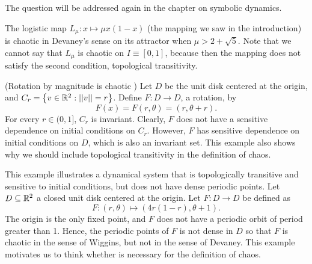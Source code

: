 \documentclass[12pt,draft,twoside]{book}
\begin{document}
  The question will be addressed again in the chapter on symbolic dynamics.
  \begin{example}
    The logistic map $L_\mu: x \mapsto \mu x(1-x)$ (the mapping we saw in the introduction) is chaotic in Devaney's sense on its attractor when $\mu > 2 + \sqrt{5}$.
    Note that we cannot say that $L_\mu$ is chaotic on $I \equiv [0,1]$, because then the mapping does not satisfy the second condition, topological transitivity.
  \end{example}
  \begin{example}
    (Rotation by magnitude is chaotic \citep{martelli})
    Let $D$ be the unit disk centered at the origin, and $C_r = \left \{ v \in \mathbb{R}^2: \left|\left| v \right|\right| = r \right \}$.
    Define $F: D \to D$, a rotation, by
    \begin{equation*}
      F(x) = F(r, \theta) = (r, \theta + r).
    \end{equation*}
    For every $r \in (0,1]$, $C_r$ is invariant.
    Clearly, $F$ does not have a sensitive dependence on initial conditions on $C_r$.
    However, $F$ has sensitive dependence on initial conditions on $D$, which is also an invariant set. 
    This example also shows why we should include topological transitivity in the definition of chaos.
  \end{example}
  \begin{example}
    \citep{martelli}
    This example illustrates a dynamical system that is topologically transitive and sensitive to initial conditions, but does not have dense periodic points.
    Let $D \subseteq \mathbb{R}^2$ a closed unit disk centered at the origin.
    Let $F: D \to D$ be defined as
    \begin{equation*}
      F: (r, \theta) \mapsto (4r(1 - r), \theta + 1).
    \end{equation*}
    The origin is the only fixed point, and $F$ does not have a periodic orbit of period greater than 1.
    Hence, the periodic points of $F$ is not dense in $D$ so that $F$ is chaotic in the sense of Wiggins, but not in the sense of Devaney.
    This example motivates us to think whether \dpp is necessary for the definition of chaos.
    \label{eg:notdpp}
  \end{example}
\end{document}
